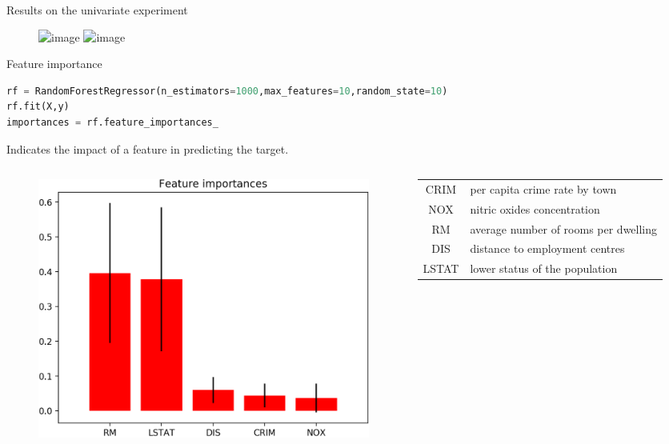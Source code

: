 \documentclass[handout]{beamer}
\begin{document}
\begin{frame}{Results on the univariate experiment}

\begin{figure}
    \centering
\caption*{
}
    \includegraphics<1>[width=.9\textwidth]{fig/L2/tree-5.png}
    \includegraphics<2>[width=.9\textwidth]{fig/L2/RF.png}

\end{figure}


\end{frame}

\begin{frame}[fragile]{Feature importance}
\begin{lstlisting}[language=Python]
rf = RandomForestRegressor(n_estimators=1000,max_features=10,random_state=10)
rf.fit(X,y)
importances = rf.feature_importances_
\end{lstlisting}
\vspace{-1.5em}
Indicates the impact of a feature in predicting the target.
\begin{columns}
    \begin{figure}
        \centering
        \includegraphics[width=.9\textwidth]{fig/L2/importance_RF.png}
    \end{figure}
    \begin{table}
    \centering
    \footnotesize
    \begin{tabular}{c|p{4.5cm}}
       CRIM   &  per capita crime rate by town \\   
       NOX    &  nitric oxides concentration  \\
       RM     &  average number of rooms per dwelling \\
       DIS    &  distance to employment centres \\
       LSTAT  &  lower status of the population \\
         
        \end{tabular}
        \end{table}

\end{columns}
\end{frame}
\end{document}
